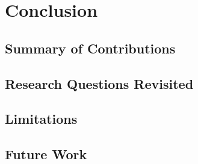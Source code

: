 \chapter{Conclusion}

\section{Summary of Contributions}

\section{Research Questions Revisited}

\section{Limitations}

\section{Future Work}
